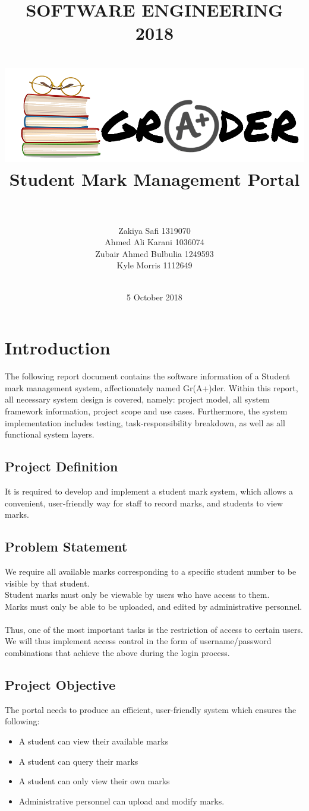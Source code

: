 \documentclass[paper=a4, fontsize=11pt]{scrartcl}
\title{
		\usefont{OT1}{bch}{b}{n}
		\normalfont \normalsize \textsc{SOFTWARE ENGINEERING 2018} \\ [25pt]
		\horrule{1.2pt} \\[0.4cm]
		\includegraphics[width = \textwidth]{Logo.png} \\\huge Student Mark Management Portal \\
		\horrule{2pt} \\[0.5cm]
}
\author{
		\normalfont 					
       \normalsize Zakiya Safi 1319070\\
       \normalsize Ahmed Ali Karani 1036074 \\
       \normalsize Zubair Ahmed Bulbulia 1249593 \\
        \normalsize Kyle Morris 1112649\\\\[-3pt]	}	\normalsize
\date{5 October 2018}
\numberwithin{equation}{section}		%
\numberwithin{figure}{section}			%
\numberwithin{table}{section}				%
\begin{document}
\maketitle
\newpage

\tableofcontents

\newpage

\section{Introduction}
The following report document contains the software information of a Student mark management system, affectionately named Gr(A+)der. Within this report, all necessary system design is covered, namely: project model, all system framework information, project scope and use cases. Furthermore, the system implementation includes testing, task-responsibility breakdown, as well as all functional system layers. 

\subsection{Project Definition}
It is required to develop and implement a student mark system, which allows a convenient, user-friendly way for staff to record marks, and students to view marks.

\subsection{Problem Statement}
We require all available marks corresponding to a specific student number to be visible by that student.\\
Student marks must only be viewable by users who have access to them.\\
Marks must only be able to be uploaded, and edited by administrative personnel.\\\\
Thus, one of the most important tasks is the restriction of access to certain users. We will thus implement access control in the form of username/password combinations that achieve the above during the login process.


\subsection{Project Objective}
The portal needs to produce an efficient, user-friendly system which ensures the following:

\begin{itemize}
\item A student can view their available marks
\item A student can query their marks
\item A student can only view their own marks \\
\item Administrative personnel can upload and modify marks.
\end{itemize}
\end{document}
